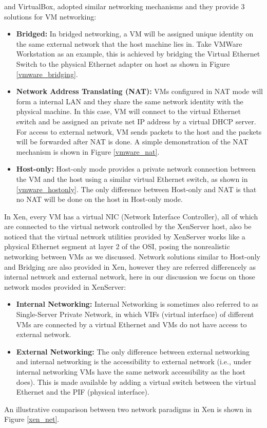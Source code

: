 \documentclass[journal,comsoc]{IEEEtran}
\begin{document}
\noindent and VirtualBox\cite{vbox}, adopted similar networking mechanisms and they provide 3 solutions for VM networking:

\begin{itemize}
	\item {\bf Bridged: }In bridged networking, a VM will be assigned unique identity on the same external network that the host machine lies in. Take VMWare Workstation as an example, this is achieved by bridging the Virtual Ethernet Switch to the physical Ethernet adapter on host as shown in Figure \ref{vmware_bridging}.
	\item {\bf Network Address Translating (NAT): }VMs configured in NAT mode will form a internal LAN and they share the same network identity with the physical machine. In this case, VM will connect to the virtual Ethernet switch and be assigned an private net IP address by a virtual DHCP server. For access to external network, VM sends packets to the host and the packets will be forwarded after NAT is done. A simple demonstration of the NAT mechanism is shown in Figure \ref{vmware_nat}.
	\item {\bf Host-only: }Host-only mode provides a private network connection between the VM and the host using a similar virtual Ethernet switch, as shown in \ref{vmware_hostonly}. The only difference between Host-only and NAT is that no NAT will be done on the host in Host-only mode.
\end{itemize}

In Xen, every VM has a virtual NIC (Network Interface Controller), all of which are connected to the virtual network controlled by the XenServer host, also be noticed that the virtual network utilities provided by XenServer works like a physical Ethernet segment at layer 2 of the OSI, posing the nonrealistic networking between VMs as we discussed. Network solutions similar to Host-only and Bridging are also provided in Xen, however they are referred differencely as internal network and external network, here in our discussion we focus on those network modes provided in XenServer:
\begin{itemize}
	\item {\bf Internal Networking: }Internal Networking is sometimes also referred to as Single-Server Private Network, in which VIFs (virtual interface) of different VMs are connected by a virtual Ethernet and VMs do not have access to external network.
	\item {\bf External Networking: }The only difference between external networking and internal networking is the accessibility to external network (i.e., under internal networking VMs have the same network accessibility as the host does). This is made available by adding a virtual switch between the virtual Ethernet and the PIF (physical interface). 
\end{itemize} 
An illustrative comparison between two network paradigms in Xen is shown in Figure \ref{xen_net}.
\end{document}
